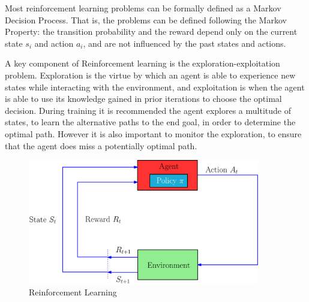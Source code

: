 
Most reinforcement learning problems can be formally defined as a Markov Decision Process. That is, the problems can be defined following the Markov Property: the transition probability and the reward depend only on the current state $s_{i} $ and action $a_{i} $, and are not influenced by the past states and actions.


A key component of Reinforcement learning is the exploration-exploitation problem. Exploration is the virtue by which an agent is able to experience new states while interacting with the environment, and exploitation is when the agent is able to use its knowledge gained in prior iterations to choose the optimal decision. During training it is recommended the agent explores a multitude of states, to learn the alternative paths to the end goal, in order to determine the optimal path. However it is also important to monitor the exploration, to ensure that the agent does miss a potentially optimal path.

\begin{figure}[H]
    \centering
    \includegraphics[width=0.9\textwidth]{images/rlv3.png}
    \caption{Reinforcement Learning}
    \label{fig:rl}
\end{figure}


